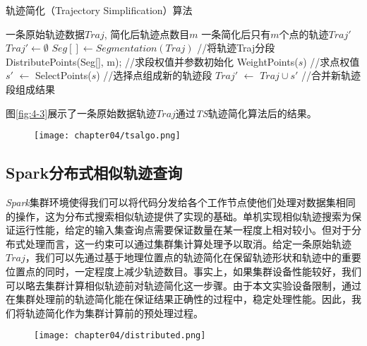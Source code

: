 \begin{algorithm}
\caption{轨迹简化（Trajectory Simplification）算法}
\label{algo:ts}
\begin{algorithmic}[1] %
\Require 一条原始轨迹数据$Traj$, 简化后轨迹点数目$m$ %
\Ensure 一条简化后只有$m$个点的轨迹$Traj'$ %
\State $Traj' \gets \emptyset$
\State $Seg[] \gets Segmentation(Traj)$ //将轨迹Traj分段
\State DistributePoints(Seg[], m);	//求段权值并参数初始化
	\State WeightPoints($s$)	//求点权值
    \State $s'$ $\gets$ SelectPoints($s$)	//选择点组成新的轨迹段
    \State $Traj'$ $\gets$ $Traj \cup s'$	//合并新轨迹段组成结果
  \EndFor
\end{algorithmic}
\end{algorithm}

图\ref{fig:4-3}展示了一条原始数据轨迹$Traj$通过\emph{TS}轨迹简化算法后的结果。

\begin{figure}[!htp]
  \centering
  \texttt{[image: chapter04/tsalgo.png]}
\end{figure}

\subsection{Spark分布式相似轨迹查询}
\label{subsec:distributed similar}
\emph{Spark}集群环境使得我们可以将代码分发给各个工作节点使他们处理对数据集相同的操作，这为分布式搜索相似轨迹提供了实现的基础。单机实现相似轨迹搜索为保证运行性能，给定的输入集查询点需要保证数量在某一程度上相对较小。但对于分布式处理而言，这一约束可以通过集群集计算处理予以取消。给定一条原始轨迹$Traj$，我们可以先通过基于地理位置点的轨迹简化在保留轨迹形状和轨迹中的重要位置点的同时，一定程度上减少轨迹数目。事实上，如果集群设备性能较好，我们可以略去集群计算相似轨迹前对轨迹简化这一步骤。由于本文实验设备限制，通过在集群处理前的轨迹简化能在保证结果正确性的过程中，稳定处理性能。因此，我们将轨迹简化作为集群计算前的预处理过程。

\begin{figure}[!htp]
  \centering
  \texttt{[image: chapter04/distributed.png]}
\end{figure}

